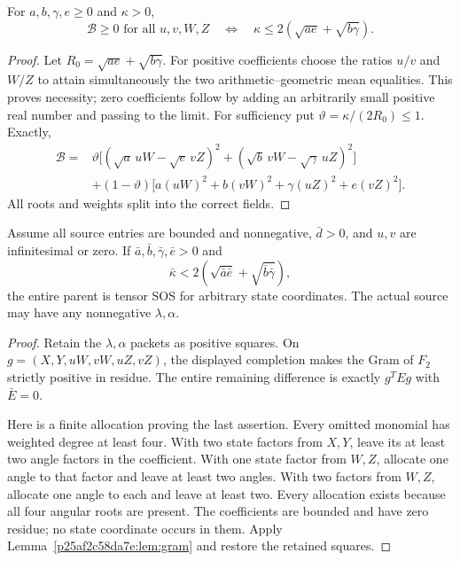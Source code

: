 \begin{proposition}
For $a,b,\gamma,e\ge0$ and $\kappa>0$,
\[
\mathcal B\ge0\text{ for all }u,v,W,Z
\quad\Longleftrightarrow\quad
\kappa\le2(\sqrt{ae}+\sqrt{b\gamma}).
\]
\end{proposition}
\begin{proof}
Let $R_0=\sqrt{ae}+\sqrt{b\gamma}$. For positive coefficients choose the ratios $u/v$ and $W/Z$ to attain simultaneously the two arithmetic--geometric mean equalities. This proves necessity; zero coefficients follow by adding an arbitrarily small positive real number and passing to the limit. For sufficiency put $\vartheta=\kappa/(2R_0)\le1$. Exactly,
\begin{align*}
\mathcal B={}&\vartheta\big[(\sqrt a\,uW-\sqrt e\,vZ)^2
 +(\sqrt b\,vW-\sqrt\gamma\,uZ)^2\big]\\
&+(1-\vartheta)\big[a(uW)^2+b(vW)^2+\gamma(uZ)^2+e(vZ)^2\big].
\end{align*}
All roots and weights split into the correct fields.
\end{proof}

\begin{theorem}
Assume all source entries are bounded and nonnegative, $\bar d>0$, and $u,v$ are infinitesimal or zero. If $\bar a,\bar b,\bar\gamma,\bar e>0$ and
\[
\bar\kappa<2(\sqrt{\bar a\bar e}+\sqrt{\bar b\bar\gamma}),
\]
the entire parent is tensor SOS for arbitrary state coordinates. The actual source may have any nonnegative $\lambda,\alpha$.
\end{theorem}
\begin{proof}
Retain the $\lambda,\alpha$ packets as positive squares. On
$g=(X,Y,uW,vW,uZ,vZ)$, the displayed completion makes the Gram of $F_2$ strictly positive in residue. The entire remaining difference is exactly $g^TEg$ with $\bar E=0$.

Here is a finite allocation proving the last assertion. Every omitted monomial has weighted degree at least four. With two state factors from $X,Y$, leave its at least two angle factors in the coefficient. With one state factor from $W,Z$, allocate one angle to that factor and leave at least two angles. With two factors from $W,Z$, allocate one angle to each and leave at least two. Every allocation exists because all four angular roots are present. The coefficients are bounded and have zero residue; no state coordinate occurs in them. Apply Lemma~\ref{p25af2c58da7e:lem:gram} and restore the retained squares.
\end{proof}

